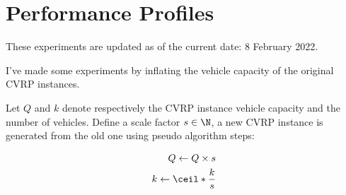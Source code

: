 \chapter{Performance Profiles}
These experiments are updated as of the current date: 8 February 2022.

I've made some experiments by inflating the vehicle capacity of the original CVRP instances.

Let $Q$ and $k$ denote respectively the CVRP instance vehicle capacity and the number of vehicles.
Define a scale factor $s \in \N$, a new CVRP instance is generated from the old one using pseudo algorithm steps:

\begin{align}
	Q \gets Q \times s \\
	k \gets \ceil*{\frac{k}{s}}
\end{align}

\renewcommand{\do}[1]{
	\begin{figure}[ht]
		\centering
		\begin{subfigure}{0.5\textwidth}
			\centering
			\texttt{[image: \#1/Time Ratio Plot.pdf]}
		\end{subfigure}%
		\begin{subfigure}{0.5\textwidth}
			\centering
			\texttt{[image: \#1/Relative Cost Plot.pdf]}
		\end{subfigure}%
	\end{figure}
}

